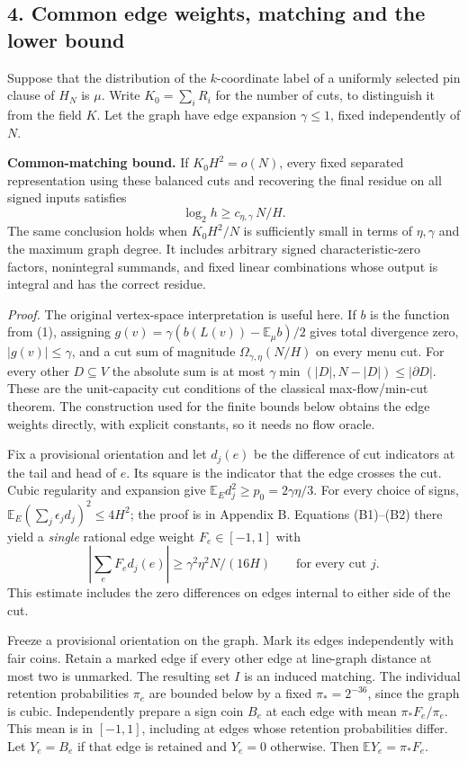 \documentclass[
  11pt,
]{article}
\begin{document}
\subsection{4. Common edge weights, matching and the lower
bound}\label{flow-matching-and-the-lower-bound}

Suppose that the distribution of the \(k\)-coordinate label of a
uniformly selected pin clause of \(H_N\) is \(\mu\). Write \(K_0=\sum_i R_i\) for the number of cuts, to distinguish it from the field \(K\).
Let the graph have edge expansion \(\gamma\le1\), fixed independently of
\(N\).

\textbf{Common-matching bound.} If \(K_0 H^2=o(N)\), every fixed separated
representation using these balanced cuts and recovering the final
residue on all signed inputs satisfies \[
                      \log_2 h\ge c_{\eta,\gamma}\,N/H .
 \tag{2}
\] The same conclusion holds when \(K_0 H^2/N\) is sufficiently small in
terms of \(\eta,\gamma\) and the maximum graph degree. It includes
arbitrary signed characteristic-zero factors, nonintegral summands, and
fixed linear combinations whose output is integral and has the correct
residue.

\emph{Proof.} The original vertex-space interpretation is useful here.
If \(b\) is the function from (1), assigning \(g(v)=\gamma
(b(L(v))-\mathbb E_\mu b)/2\) gives total divergence zero,
\(|g(v)|\le\gamma\), and a cut sum of magnitude
\(\Omega_{\gamma,\eta}(N/H)\) on every menu cut. For every other
\(D\subseteq V\) the absolute sum is at most
\(\gamma\min(|D|,N-|D|)\le|\partial D|\). These are the unit-capacity
cut conditions of the classical max-flow/min-cut theorem. The construction
used for the finite bounds below obtains the edge weights directly, with
explicit constants, so it needs no flow oracle.

Fix a provisional orientation and let \(d_j(e)\) be the difference of
cut indicators at the tail and head of \(e\). Its square is the indicator
that the edge crosses the cut. Cubic regularity and expansion give
\(\mathbb E_E d_j^2\ge p_0=2\gamma\eta/3\). For every choice of signs,
\(\mathbb E_E(\sum_j\epsilon_jd_j)^2\le4H^2\); the proof is in
Appendix B. Equations (B1)--(B2) there yield a \emph{single} rational
edge weight \(F_e\in[-1,1]\) with
\[
       \left|\sum_e F_e d_j(e)\right|
       \ge \gamma^2\eta^2 N/(16H)
       \qquad\text{for every cut }j .
\]
This estimate includes the zero differences on edges internal to either side of the cut.

Freeze a provisional orientation on the graph. Mark its edges
independently with fair coins. Retain a marked edge if every other edge
at line-graph distance at most two is unmarked. The resulting set \(I\)
is an induced matching. The individual retention probabilities \(\pi_e\)
are bounded below by a fixed \(\pi_*=2^{-36}\), since the graph is cubic.
Independently prepare a sign coin \(B_e\) at each edge with mean
\(\pi_*F_e/\pi_e\). This mean is in \([-1,1]\), including at edges whose
retention probabilities differ. Let \(Y_e=B_e\) if that edge is retained
and \(Y_e=0\) otherwise. Then \(\mathbb E Y_e=\pi_*F_e\).
\end{document}
